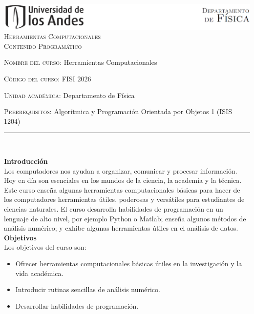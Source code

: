 \documentclass[letterpaper,10pt,onecolumn]{article}
\begin{document}
\begin{center}

\includegraphics[width=490pt]{header.png}\\[0.5cm]

\textsc{\huge Herramientas Computacionales}\\[0.1cm]

\Large \textsc{Contenido Programático}\\[0.7cm]

\end{center}

\large \noindent\textsc{Nombre del curso:} Herramientas Computacionales
	 
\noindent\textsc{Código del curso:} FISI 2026

\noindent\textsc{Unidad académica:} Departamento de Física

\noindent\textsc{Prerrequisitos:} Algorítmica y Programación Orientada por Objetos 1 (ISIS 1204)

\noindent\rule{\textwidth}{1pt}\\[-0.1cm]

\addtocounter{mysection}{1}

\noindent\textbf{\large {} \quad Introducción}\\[-0.2cm]

\noindent\normalsize Los computadores nos ayudan a organizar,
comunicar y procesar información.
Hoy en día son esenciales en los mundos de la ciencia, la academia y
la técnica. 
Este curso enseña algunas herramientas computacionales básicas para
hacer de los computadores herramientas útiles, poderosas y
versátiles para estudiantes de ciencias naturales. 
El curso desarrolla habilidades de programación en un lenguaje de alto
nivel, por ejemplo Python o Matlab; enseña algunos métodos de análisis
numérico; y exhibe algunas herramientas útiles en el análisis de 
datos. \\[0.1cm] 

\noindent\textbf{\large {} \quad Objetivos}\\[-0.2cm]

\noindent\normalsize Los objetivos del curso son:

\begin{itemize}
	\item Ofrecer herramientas computacionales básicas útiles en la investigación y la vida académica.\\[-0.6cm]
	\item Introducir rutinas sencillas de análisis numérico.\\[-0.6cm]
	\item Desarrollar habilidades de programación.\\[-0.2cm]
\end{itemize}
\end{document}
